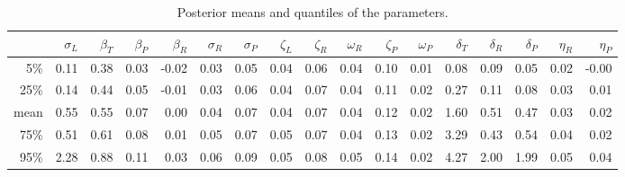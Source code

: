 \documentclass{article}
\begin{document}
\begin{table}[ht]
    \footnotesize
\centering
\begin{tabular}{rrrrrrrrrrrrrrrrr}
  \hline
        &  $\sigma_L$  &  $\beta_T$  &  $\beta_P$  &  $\beta_R$  &  $\sigma_R$  &  $\sigma_P$  &  $\zeta_L$  &  $\zeta_R$  &  $\omega_R$  &  $\zeta_P$  &  $\omega_P$  &  $\delta_T$  &  $\delta_R$  &  $\delta_P$  &  $\eta_R$  &  $\eta_P$  \\
\hline
5\%     &  0.11        &  0.38       &  0.03       &  -0.02      &  0.03        &  0.05        &  0.04       &  0.06       &  0.04        &  0.10       &  0.01        &  0.08        &  0.09        &  0.05        &  0.02      &  -0.00     \\
25\%    &  0.14        &  0.44       &  0.05       &  -0.01      &  0.03        &  0.06        &  0.04       &  0.07       &  0.04        &  0.11       &  0.02        &  0.27        &  0.11        &  0.08        &  0.03      &  0.01      \\
mean    &  0.55        &  0.55       &  0.07       &  0.00       &  0.04        &  0.07        &  0.04       &  0.07       &  0.04        &  0.12       &  0.02        &  1.60        &  0.51        &  0.47        &  0.03      &  0.02      \\
75\%    &  0.51        &  0.61       &  0.08       &  0.01       &  0.05        &  0.07        &  0.05       &  0.07       &  0.04        &  0.13       &  0.02        &  3.29        &  0.43        &  0.54        &  0.04      &  0.02      \\
95\%    &  2.28        &  0.88       &  0.11       &  0.03       &  0.06        &  0.09        &  0.05       &  0.08       &  0.05        &  0.14       &  0.02        &  4.27        &  2.00        &  1.99        &  0.05      &  0.04      \\
   \hline
\end{tabular}
\caption{ \label{tab:posterior_distrns} Posterior means and quantiles of the parameters.  }
\end{table}
\end{document}
